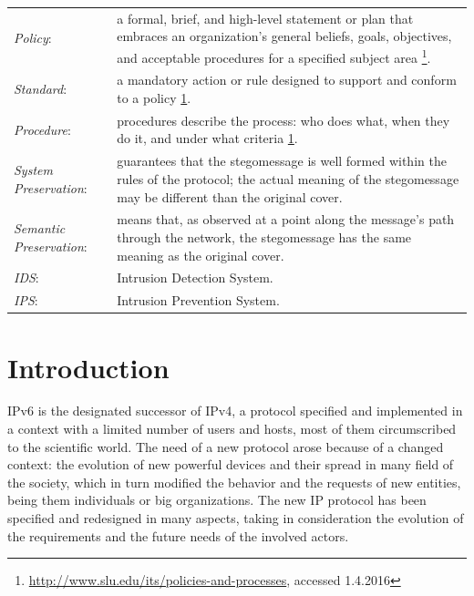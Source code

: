 \documentclass[12pt]{article}
\begin{document}
\begin{savenotes}
\begin{tabular}{L{3.3cm}L{12cm}}
\hdashline
\textit{Policy}:&a formal, brief, and high-level statement or plan that embraces an organization's general beliefs, goals, objectives, and acceptable procedures for a specified subject area \footnote{\label{policy}\url{http://www.slu.edu/its/policies-and-processes}, accessed 1.4.2016}.\\
\hdashline
\textit{Standard}:&a mandatory action or rule designed to support and conform to a policy \cref{policy}.\\
\hdashline
\textit{Procedure}:&procedures describe the process: who does what, when they do it, and under what criteria \cref{policy}.\\
\hdashline
\textit{System Preservation}:&guarantees that the stegomessage is well formed within the rules of the protocol; the actual meaning of the stegomessage may be different than the original cover\cite{lucena2}.\\
\hdashline
\textit{Semantic Preservation}:&means that, as observed at a point along the message’s path through the network, the stegomessage has the same meaning as the original cover\cite{lucena2}.\\
\hdashline
\textit{IDS}:&Intrusion Detection System.\\
\hdashline
\textit{IPS}:&Intrusion Prevention System.\\
\end{tabular}
\end{savenotes}



\pagebreak

\tableofcontents
\newpage
\listoffigures
\pagebreak
\listoftables
\pagebreak

\section{Introduction}
\label{sec:1}


IPv6 is the designated successor of IPv4, a protocol specified and implemented in a context with a limited number of users and hosts, most of them circumscribed to the scientific world. The need of a new protocol arose because of a changed context: the evolution of new powerful devices and their spread in many field of the society, which in turn modified the behavior and the requests of new entities, being them individuals or big organizations. The new IP protocol has been specified and redesigned in many aspects, taking in consideration the evolution of the requirements and the future needs of the involved actors.
\end{document}
